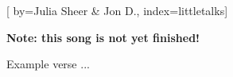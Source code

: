 

[%
    by={Julia Sheer \& Jon D.},
    index={littletalks}]


    \label{littletalks}

    \textbf{Note: this song is not yet finished!}

    \beginverse
        Example verse ...
    \endverse
\endsong
